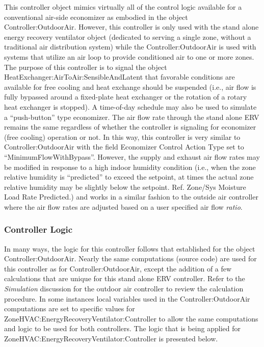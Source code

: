 This controller object mimics virtually all of the control logic available for a conventional air-side economizer as embodied in the object Controller:OutdoorAir. However, this controller is only used with the stand alone energy recovery ventilator object (dedicated to serving a single zone, without a traditional air distribution system) while the Controller:OutdoorAir is used with systems that utilize an air loop to provide conditioned air to one or more zones. The purpose of this controller is to signal the object HeatExchanger:AirToAir:SensibleAndLatent that favorable conditions are available for free cooling and heat exchange should be suspended (i.e., air flow is fully bypassed around a fixed-plate heat exchanger or the rotation of a rotary heat exchanger is stopped). A time-of-day schedule may also be used to simulate a ``push-button'' type economizer. The air flow rate through the stand alone ERV remains the same regardless of whether the controller is signaling for economizer (free cooling) operation or not. In this way, this controller is very similar to Controller:OutdoorAir with the field Economizer Control Action Type set to ``MinimumFlowWithBypass''. However, the supply and exhaust air flow rates may be modified in response to a high indoor humidity condition (i.e., when the zone relative humidity is ``predicted'' to exceed the setpoint, at times the actual zone relative humidity may be slightly below the setpoint. Ref. Zone/Sys Moisture Load Rate Predicted.) and works in a similar fashion to the outside air controller where the air flow rates are adjusted based on a user specified air flow \emph{ratio}.

\subsubsection{Controller Logic}\label{controller-logic}

In many ways, the logic for this controller follows that established for the object Controller:OutdoorAir. Nearly the same computations (source code) are used for this controller as for Controller:OutdoorAir, except the addition of a few calculations that are unique for this stand alone ERV controller. Refer to the \emph{Simulation} discussion for the outdoor air controller to review the calculation procedure. In some instances local variables used in the Controller:OutdoorAir computations are set to specific values for ZoneHVAC:EnergyRecoveryVentilator:Controller to allow the same computations and logic to be used for both controllers. The logic that is being applied for ZoneHVAC:EnergyRecoveryVentilator:Controller is presented below.

